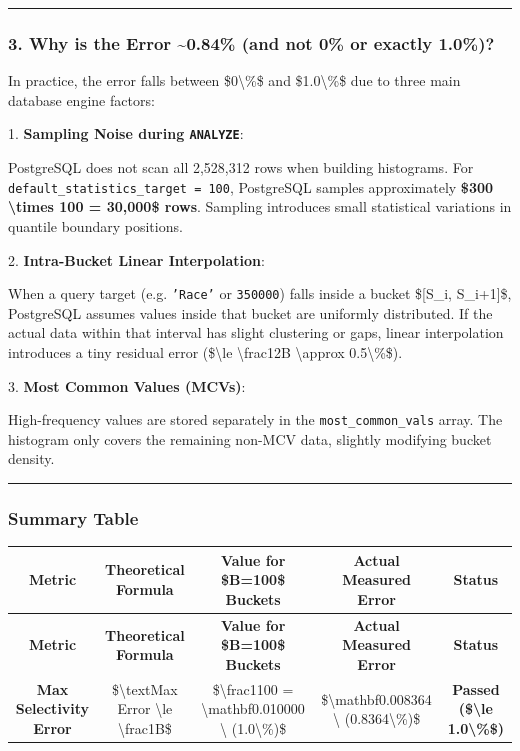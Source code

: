 \documentclass[11pt,a4paper]{article}
\begin{document}
{\hrule


\subsubsection{3. Why is the Error \textasciitilde{}0.84\% (and not 0\% or exactly 1.0\%)?}

In practice, the error falls between \$0\textbackslash{}\%\$ and \$1.0\textbackslash{}\%\$ due to three main database engine factors:


1. \textbf{Sampling Noise during \texttt{ANALYZE}}:

PostgreSQL does not scan all 2,528,312 rows when building histograms. For \texttt{default\_statistics\_target = 100}, PostgreSQL samples approximately \textbf{\$300 \textbackslash{}times 100 = 30,000\$ rows}. Sampling introduces small statistical variations in quantile boundary positions.


2. \textbf{Intra-Bucket Linear Interpolation}:

When a query target (e.g. \texttt{'Race'} or \texttt{350000}) falls inside a bucket \$[S\_i, S\_{i+1}]\$, PostgreSQL assumes values inside that bucket are uniformly distributed. If the actual data within that interval has slight clustering or gaps, linear interpolation introduces a tiny residual error (\$\textbackslash{}le \textbackslash{}frac{1}{2B} \textbackslash{}approx 0.5\textbackslash{}\%\$).


3. \textbf{Most Common Values (MCVs)}:

High-frequency values are stored separately in the \texttt{most\_common\_vals} array. The histogram only covers the remaining non-MCV data, slightly modifying bucket density.


\hrule


\subsubsection{Summary Table}

{\begingroup
\small
\setlength{\tabcolsep}{4pt}
\begin{xltabular}{\textwidth}{C | C | C | C | C}
\toprule
\textbf{Metric} & \textbf{Theoretical Formula} & \textbf{Value for \$B=100\$ Buckets} & \textbf{Actual Measured Error} & \textbf{Status} \\
\midrule
\endfirsthead
\toprule
\textbf{Metric} & \textbf{Theoretical Formula} & \textbf{Value for \$B=100\$ Buckets} & \textbf{Actual Measured Error} & \textbf{Status} \\
\midrule
\endfirsthead
\endhead
\bottomrule
\endfoot
\bottomrule
\endlastfoot
\textbf{Max Selectivity Error} & \$\textbackslash{}text{Max Error} \textbackslash{}le \textbackslash{}frac{1}{B}\$ & \$\textbackslash{}frac{1}{100} = \textbackslash{}mathbf{0.010000 \textbackslash{} (1.0\textbackslash{}\%)}\$ & \$\textbackslash{}mathbf{0.008364 \textbackslash{} (0.8364\textbackslash{}\%)}\$ & \textbf{Passed (\$\textbackslash{}le 1.0\textbackslash{}\%\$)} \\
\end{xltabular}
\endgroup}


}
\end{document}
